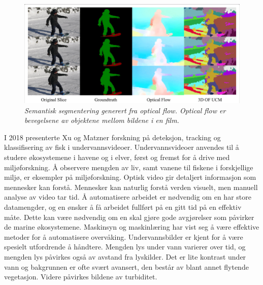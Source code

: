 \begin{figure}
\begin{center} 
\includegraphics[scale=0.45]{figures/optical_flow}
\caption{\small \sl Semantisk segmentering generert fra optical flow. Optical flow er bevegelsene av objektene mellom bildene i en film. \cite{Lin 2019}
\label{fig:optical_flow}} 
\end{center} 
\end{figure} 

I 2018 presenterte Xu og Matzner forskning på deteksjon, tracking og klassifisering av fisk i undervannsvideoer. Undervannsvideoer anvendes til å studere økosystemene i havene og i elver, først og fremst for å drive med miljøforskning. Å observere mengden av liv, samt vanene til fiskene i forskjellige miljø, er eksempler på miljøforskning. Optisk video gir detaljert informasjon som mennesker kan forstå. Mennesker kan naturlig forstå verden visuelt, men manuell analyse av video tar tid. Å automatisere arbeidet er nødvendig om en har store datamengder, og en ønsker å få arbeidet fullført på en gitt tid på en effektiv måte. Dette kan være nødvendig om en skal gjøre gode avgjørelser som påvirker de marine økosystemene. Maskinsyn og maskinlæring har vist seg å være effektive metoder for å automatisere overvåking. Undervannsbilder er kjent for å være spesielt utfordrende å håndtere. Mengden lys under vann varierer over tid, og mengden lys påvirkes også av avstand fra lyskilder. Det er lite kontrast under vann og bakgrunnen er ofte svært avansert, den består av blant annet flytende vegetasjon. Videre påvirkes bildene av turbiditet. \cite{Xu og Matzner 2018}


